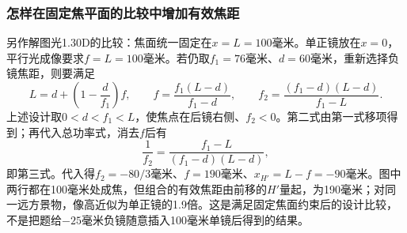 \documentclass[UTF8,fontset=fandol,a4paper,11pt]{ctexart}
\begin{document}
\subsubsection*{怎样在固定焦平面的比较中增加有效焦距}
另作解图光1.30D的比较：焦面统一固定在$x=L=100$毫米。单正镜放在$x=0$，平行光成像要求$f=L=100$毫米。若仍取$f_1=76$毫米、$d=60$毫米，重新选择负镜焦距，则要满足
\[
L=d+\left(1-\frac d{f_1}\right)f,
\qquad
f=\frac{f_1(L-d)}{f_1-d},
\qquad
f_2=\frac{(f_1-d)(L-d)}{f_1-L}.
\]
上述设计取$0<d<f_1<L$，使焦点在后镜右侧、$f_2<0$。第二式由第一式移项得到；再代入总功率式，消去$f$后有
\[
\frac1{f_2}
=\frac{f_1-L}{(f_1-d)(L-d)},
\]
即第三式。代入得$f_2=-80/3$毫米、$f=190$毫米、$x_{H'}=L-f=-90$毫米。图中两行都在100毫米处成焦，但组合的有效焦距由前移的$H'$量起，为190毫米；对同一远方景物，像高近似为单正镜的1.9倍。这是满足固定焦面约束后的设计比较，不是把题给$-25$毫米负镜随意插入100毫米单镜后得到的结果。
\end{document}
